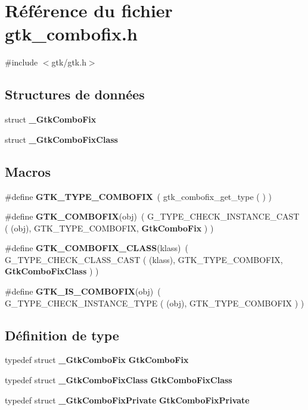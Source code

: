 \section{Référence du fichier gtk\_\-combofix.h}
\label{gtk__combofix_8h}
{\ttfamily \#include $<$gtk/gtk.h$>$}\par
\subsection*{Structures de données}
\begin{DoxyCompactItemize}
\item 
struct {\bf \_\-GtkComboFix}
\item 
struct {\bf \_\-GtkComboFixClass}
\end{DoxyCompactItemize}
\subsection*{Macros}
\begin{DoxyCompactItemize}
\item 
\#define {\bf GTK\_\-TYPE\_\-COMBOFIX}~( gtk\_\-combofix\_\-get\_\-type ( ) )
\item 
\#define {\bf GTK\_\-COMBOFIX}(obj)~( G\_\-TYPE\_\-CHECK\_\-INSTANCE\_\-CAST ( (obj), GTK\_\-TYPE\_\-COMBOFIX, {\bf GtkComboFix} ) )
\item 
\#define {\bf GTK\_\-COMBOFIX\_\-CLASS}(klass)~( G\_\-TYPE\_\-CHECK\_\-CLASS\_\-CAST ( (klass),  GTK\_\-TYPE\_\-COMBOFIX, {\bf GtkComboFixClass} ) )
\item 
\#define {\bf GTK\_\-IS\_\-COMBOFIX}(obj)~( G\_\-TYPE\_\-CHECK\_\-INSTANCE\_\-TYPE ( (obj), GTK\_\-TYPE\_\-COMBOFIX ) )
\end{DoxyCompactItemize}
\subsection*{Définition de type}
\begin{DoxyCompactItemize}
\item 
typedef struct {\bf \_\-GtkComboFix} {\bf GtkComboFix}
\item 
typedef struct {\bf \_\-GtkComboFixClass} {\bf GtkComboFixClass}
\item 
typedef struct {\bf \_\-GtkComboFixPrivate} {\bf GtkComboFixPrivate}
\end{DoxyCompactItemize}
